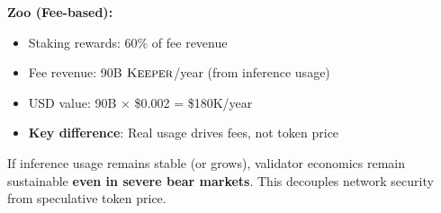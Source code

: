 \textbf{Zoo (Fee-based):}
\begin{itemize}
\item Staking rewards: 60\% of fee revenue
\item Fee revenue: 90B $\textsc{Keeper}$/year (from inference usage)
\item USD value: 90B × \$0.002 = \$180K/year
\item \textbf{Key difference}: Real usage drives fees, not token price
\end{itemize}

If inference usage remains stable (or grows), validator economics remain sustainable \textbf{even in severe bear markets}. This decouples network security from speculative token price.

